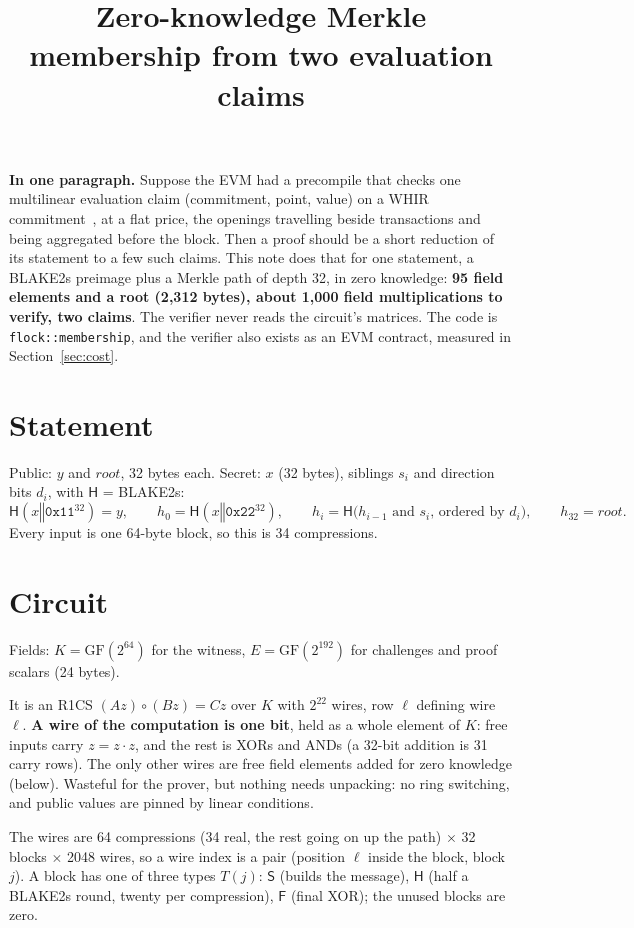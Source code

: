\documentclass[11pt]{article}
\title{Zero-knowledge Merkle membership from two evaluation claims}
\author{}
\date{}
\newcommand{\K}{K}
\newcommand{\E}{E}
\newcommand{\hash}{\mathsf{H}}
\newcommand{\concat}{\mathbin\Vert}
\newcommand{\rootnode}{\mathit{root}}
\newcommand{\code}[1]{\texttt{#1}}
\begin{document}
\maketitle

\noindent\textbf{In one paragraph.} Suppose the EVM had a precompile that checks one multilinear evaluation claim (commitment, point, value) on a WHIR commitment~\cite{ACFY25}, at a flat price, the openings travelling beside transactions and being aggregated before the block. Then a proof should be a short reduction of its statement to a few such claims. This note does that for one statement, a BLAKE2s preimage plus a Merkle path of depth 32, in zero knowledge: \textbf{95 field elements and a root (2{,}312 bytes), about 1{,}000 field multiplications to verify, two claims}. The verifier never reads the circuit's matrices. The code is \code{flock::membership}, and the verifier also exists as an EVM contract, measured in Section~\ref{sec:cost}.

\section{Statement}

Public: $y$ and $\rootnode$, 32 bytes each. Secret: $x$ (32 bytes), siblings $s_i$ and direction bits $d_i$, with $\hash$ = BLAKE2s:
\[
  \hash(x \concat \mathtt{0x11}^{32}) = y, \qquad
  h_0 = \hash(x \concat \mathtt{0x22}^{32}), \qquad
  h_i = \hash\bigl(\text{$h_{i-1}$ and $s_i$, ordered by $d_i$}\bigr), \qquad
  h_{32} = \rootnode .
\]
Every input is one 64-byte block, so this is 34 compressions.

\section{Circuit}

Fields: $\K = \mathrm{GF}(2^{64})$ for the witness, $\E = \mathrm{GF}(2^{192})$ for challenges and proof scalars (24 bytes).

It is an R1CS $(Az) \circ (Bz) = Cz$ over $\K$ with $2^{22}$ wires, row $\ell$ defining wire $\ell$. \textbf{A wire of the computation is one bit}, held as a whole element of $\K$: free inputs carry $z = z \cdot z$, and the rest is XORs and ANDs (a 32-bit addition is 31 carry rows). The only other wires are free field elements added for zero knowledge (below). Wasteful for the prover, but nothing needs unpacking: no ring switching, and public values are pinned by linear conditions.

The wires are 64 compressions (34 real, the rest going on up the path) $\times$ 32 blocks $\times$ 2048 wires, so a wire index is a pair (position $\ell$ inside the block, block $j$). A block has one of three types $T(j)$: $\mathsf S$ (builds the message), $\mathsf H$ (half a BLAKE2s round, twenty per compression), $\mathsf F$ (final XOR); the unused blocks are zero.
\end{document}
